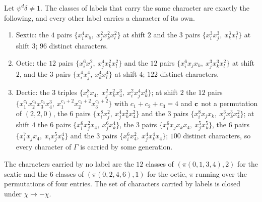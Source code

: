 \begin{proposition}\label{prop:wchars}
Let $\psi^d\delta\ne1$. The classes of labels that carry the same character
are exactly the following, and every other label carries a character of its
own.
\begin{enumerate}[label=\textup{(\alph*)},leftmargin=*,itemsep=1pt]
\item Sextic: the $4$ pairs $\{x_i^4x_5,\ x_j^2x_k^2x_l^2\}$ at shift
$2$ and the $3$ pairs $\{x_i^3x_j^3,\ x_k^3x_l^3\}$ at shift $3$; $96$
distinct characters.
\item Octic: the $12$ pairs $\{x_i^6x_j^2,\ x_j^4x_k^2x_l^2\}$ and the $12$
pairs $\{x_i^6x_jx_k,\ x_j^3x_k^3x_l^2\}$ at shift $2$, and the $3$ pairs
$\{x_i^4x_j^4,\ x_k^4x_l^4\}$ at shift $4$; $122$ distinct characters.
\item Dectic: the $3$ triples $\{x_i^8x_4,\ x_j^2x_k^2x_4^3,\
x_i^2x_j^4x_k^4\}$; at shift $2$ the $12$ pairs $\{x_1^{c_1}x_2^{c_2}
x_3^{c_3}x_4^3,\ x_1^{c_1+2}x_2^{c_2+2}x_3^{c_3+2}\}$ with $c_1+c_2+c_3=4$
and $\mathbf{c}$ not a permutation of $(2,2,0)$, the $6$ pairs
$\{x_i^8x_j^2,\ x_j^4x_k^2x_4^2\}$ and the $3$ pairs
$\{x_i^8x_jx_k,\ x_j^3x_k^3x_4^2\}$; at shift $4$ the $6$ pairs
$\{x_i^6x_j^2x_4,\ x_j^6x_k^4\}$, the $3$ pairs
$\{x_i^6x_jx_kx_4,\ x_j^5x_k^5\}$, the $6$ pairs
$\{x_i^7x_jx_4,\ x_ix_j^5x_k^4\}$ and the $3$ pairs
$\{x_i^6x_4^2,\ x_j^4x_k^4x_4\}$; $100$ distinct characters, so every
character of $\Gamma$ is carried by some generation.
\end{enumerate}
The characters carried by no label are the $12$ classes of
$(\pi(0,1,3,4),2)$ for the sextic and the $6$ classes of
$(\pi(0,2,4,6),1)$ for the octic, $\pi$ running over the permutations of
four entries. The set of characters carried by labels is closed under
$\chi\mapsto-\chi$.
\end{proposition}

